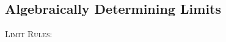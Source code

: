 \documentclass{article}
\newcounter{example}[section]
\begin{document}



\subsection*{Algebraically Determining Limits}

\textsc{Limit Rules}: \newline\\
\end{document}
